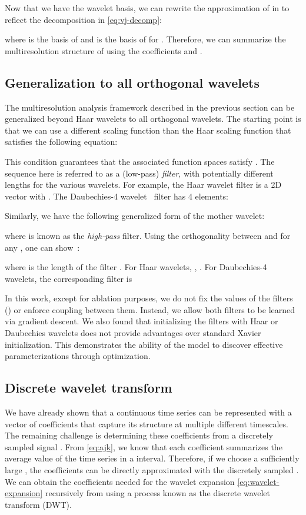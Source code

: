 \documentclass{article}
\theoremstyle{plain}
\theoremstyle{definition}
\theoremstyle{remark}
\begin{document}
Now that we have the wavelet basis, we can rewrite the approximation of  in  to reflect the decomposition in \eqref{eq:vj-decomp}:

where  is the basis of  and  is the basis of  for . 
Therefore, we can summarize the multiresolution structure of  using the coefficients  and . 


\subsection{Generalization to all orthogonal wavelets}
\label{app:orth-wavelets}

The multiresolution analysis framework described in the previous section can be generalized beyond Haar wavelets
to all orthogonal wavelets. 
The starting point is that we can use a different scaling function than the Haar scaling function that satisfies the following equation:

This condition guarantees that the associated function spaces satisfy . 
The sequence  here is referred to as a (low-pass) \emph{filter}, with potentially different lengths for the various wavelets.
For example, the Haar wavelet filter is a 2D vector with . 
The Daubechies-4 wavelet~\citep{daubechies1988orthonormal} filter has 4 elements:

Similarly, we have the following generalized form of
the mother wavelet:

where  is known as the \emph{high-pass} filter.
Using the orthogonality between  and  for any , one can show~\citep[see, e.g.,][]{strang1996wavelets}: 

where  is the length of the filter . For Haar wavelets, , . 
For Daubechies-4 wavelets, the corresponding  filter is

In this work, except for ablation purposes, we do not fix the values of the filters () or enforce coupling between them.
Instead, we allow both filters to be learned via gradient descent. 
We also found that initializing the filters with Haar or Daubechies wavelets does not provide advantages over standard Xavier initialization.
This demonstrates the ability of the model to discover effective parameterizations through optimization.

\subsection{Discrete wavelet transform}
\label{app:dwt}

We have already shown that a continuous time series can be represented with a vector of coefficients that capture its structure at multiple different timescales. 
The remaining challenge is determining these coefficients from a discretely sampled signal . 
From \eqref{eq:ajk}, we know that each coefficient  summarizes the average value of the time series in a  interval. 
Therefore, if we choose a sufficiently large , the coefficients  can be directly approximated with the discretely sampled . 
We can obtain the coefficients needed for the wavelet expansion \eqref{eq:wavelet-expansion} recursively from  using a process known as the discrete wavelet transform (DWT).
\end{document}
